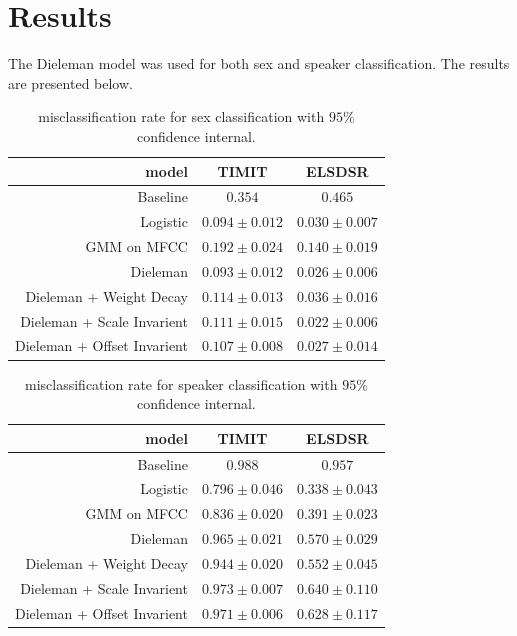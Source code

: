 \section{Results}

The Dieleman model was used for both sex and speaker classification. The results are presented below.

\begin{table}[H]
\centering
\begin{tabular}{r|c|c}
model & TIMIT & ELSDSR \\ \hline
                    Baseline & $0.354$ & $0.465$ \\
                    Logistic & $0.094 \pm 0.012$ & $0.030 \pm 0.007$ \\
                 GMM on MFCC & $0.192 \pm 0.024$ & $0.140 \pm 0.019$ \\
                    Dieleman & $0.093 \pm 0.012$ & $0.026 \pm 0.006$ \\
     Dieleman + Weight Decay & $0.114 \pm 0.013$ & $0.036 \pm 0.016$ \\
  Dieleman + Scale Invarient & $0.111 \pm 0.015$ & $0.022 \pm 0.006$ \\
 Dieleman + Offset Invarient & $0.107 \pm 0.008$ & $0.027 \pm 0.014$ \\
\end{tabular}
\caption{misclassification rate for sex classification with $95\%$ confidence internal.}
\end{table}

\begin{table}[H]
\centering
\begin{tabular}{r|c|c}
model & TIMIT & ELSDSR \\ \hline
                    Baseline & $0.988$ & $0.957$ \\
                    Logistic & $0.796 \pm 0.046$ & $0.338 \pm 0.043$ \\
                 GMM on MFCC & $0.836 \pm 0.020$ & $0.391 \pm 0.023$ \\
                    Dieleman & $0.965 \pm 0.021$ & $0.570 \pm 0.029$ \\
     Dieleman + Weight Decay & $0.944 \pm 0.020$ & $0.552 \pm 0.045$ \\
  Dieleman + Scale Invarient & $0.973 \pm 0.007$ & $0.640 \pm 0.110$ \\
 Dieleman + Offset Invarient & $0.971 \pm 0.006$ & $0.628 \pm 0.117$ \\
\end{tabular}
\caption{misclassification rate for speaker classification with $95\%$ confidence internal.}
\end{table}

